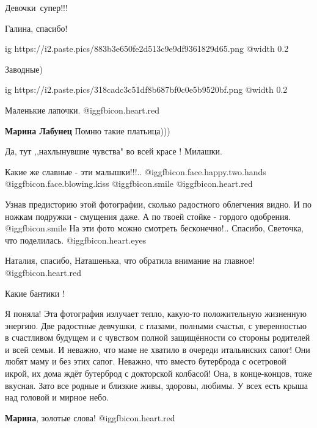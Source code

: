  
 
 
 
 

Девочки~супер!!!

Галина, спасибо!


\ifcmt
  ig https://i2.paste.pics/883b3e650fe2d513c9e9df9361829d65.png
  @width 0.2
\fi

Заводные)


\ifcmt
  ig https://i2.paste.pics/318cadc3c51df8b687bf0c0e5b9520bf.png
  @width 0.2
\fi

Маленькие лапочки. @igg{fbicon.heart.red}

\textbf{Марина Лабунец} Помню такие платьица)))

Да, тут ,,нахлынувшие чувства" во всей красе ! Милашки.


Какие же славные - эти малышки!!!..  @igg{fbicon.face.happy.two.hands}
@igg{fbicon.face.blowing.kiss}  @igg{fbicon.smile}  @igg{fbicon.heart.red}



Узнав предисторию этой фотографии, сколько радостного облегчения видно. И по
ножкам подружки - смущения даже. А по твоей стойке - гордого одобрения. @igg{fbicon.smile}  На
эти фото можно смотреть бесконечно!.. Спасибо, Светочка, что поделилась.  @igg{fbicon.heart.eyes} 


Наталия, спасибо, Наташенька, что обратила внимание на главное!
@igg{fbicon.heart.red}

Какие бантики !


Я поняла! Эта фотография излучает тепло, какую-то положительную жизненную
энергию. Две радостные девчушки, с глазами, полными счастья, с уверенностью в
счастливом будущем и с чувством полной защищённости со стороны родителей и всей
семьи. И неважно, что маме не хватило в очереди итальянских сапог! Они любят
маму и без этих сапог. Неважно, что вместо бутерброда с осетровой икрой, их
дома ждёт бутерброд с докторской колбасой! Она, в конце-концов, тоже вкусная.
Зато все родные и близкие живы, здоровы, любимы. У всех есть крыша над головой
и мирное небо.

\textbf{Марина}, золотые слова! @igg{fbicon.heart.red}
